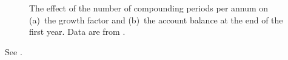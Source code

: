 \documentclass[a4paper,oneside,12pt]{article}
\begin{document}
\begin{problem}
{\begin{solution}
\begin{figure}[!htbp]
\centering
{}
\caption{%
  The effect of the number of compounding periods per annum on
  (a)~the growth factor and (b)~the account balance at the end of the
  first year.  Data are from
  .
}
\label{fig:e_balance_up_to_12_compounding}
\end{figure}

See .


\end{solution}}
\end{problem}
\end{document}
